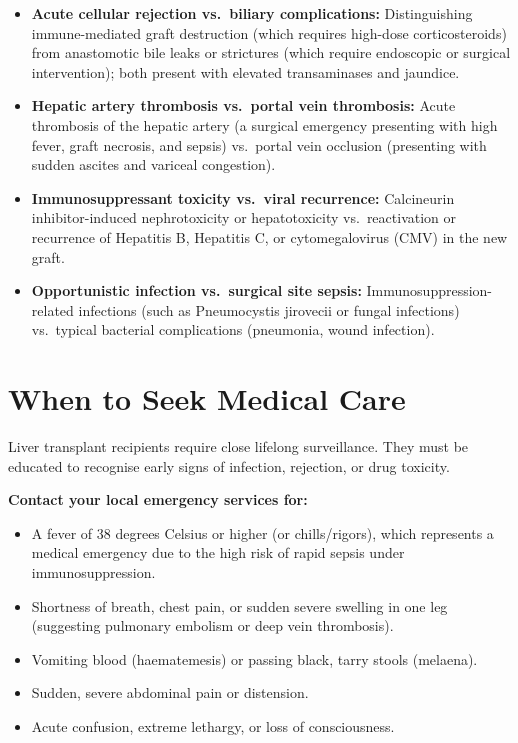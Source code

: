 \begin{itemize}
    \item \textbf{Acute cellular rejection vs.\ biliary complications:} Distinguishing immune-mediated graft destruction (which requires high-dose corticosteroids) from anastomotic bile leaks or strictures (which require endoscopic or surgical intervention); both present with elevated transaminases and jaundice.
    \item \textbf{Hepatic artery thrombosis vs.\ portal vein thrombosis:} Acute thrombosis of the hepatic artery (a surgical emergency presenting with high fever, graft necrosis, and sepsis) vs.\ portal vein occlusion (presenting with sudden ascites and variceal congestion).
    \item \textbf{Immunosuppressant toxicity vs.\ viral recurrence:} Calcineurin inhibitor-induced nephrotoxicity or hepatotoxicity vs.\ reactivation or recurrence of Hepatitis B, Hepatitis C, or cytomegalovirus (CMV) in the new graft.
    \item \textbf{Opportunistic infection vs.\ surgical site sepsis:} Immunosuppression-related infections (such as Pneumocystis jirovecii or fungal infections) vs.\ typical bacterial complications (pneumonia, wound infection).
\end{itemize}

\section*{When to Seek Medical Care}
Liver transplant recipients require close lifelong surveillance. They must be educated to recognise early signs of infection, rejection, or drug toxicity.

\textbf{Contact your local emergency services for:}
\begin{itemize}
    \item A fever of 38 degrees Celsius or higher (or chills/rigors), which represents a medical emergency due to the high risk of rapid sepsis under immunosuppression.
    \item Shortness of breath, chest pain, or sudden severe swelling in one leg (suggesting pulmonary embolism or deep vein thrombosis).
    \item Vomiting blood (haematemesis) or passing black, tarry stools (melaena).
    \item Sudden, severe abdominal pain or distension.
    \item Acute confusion, extreme lethargy, or loss of consciousness.
\end{itemize}

